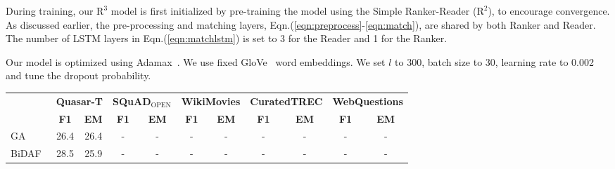 \documentclass[letterpaper]{article} \usepackage{aaai18}  \usepackage{times}  \usepackage{helvet}  \usepackage{courier}  \usepackage{url}  \usepackage{graphicx}  \usepackage{comment}
\begin{document}
During training, our $\text{R}^3$ model is first initialized by pre-training the model using the Simple Ranker-Reader ($\text{R}^2$), to encourage convergence.
As discussed earlier, the pre-processing and matching layers, Eqn.(\ref{eqn:preprocess}-\ref{eqn:match}), are shared by both Ranker and Reader. The number of LSTM layers in Eqn.(\ref{eqn:matchlstm}) is set to 3 for the Reader and 1 for the Ranker.

Our model is optimized using Adamax~\cite{kingma2014adam:iclr2015}. We use fixed GloVe~\cite{glove:emnlp2014} 
word embeddings.
We set $l$ to 300, batch size to 30, learning rate to 0.002 and tune the dropout probability.


\begin{table*}[t]
\centering
\small
\begin{tabular}{lcccccccccc}
\toprule
                  & \multicolumn{2}{c}{\bf Quasar-T} & \multicolumn{2}{c}{\bf SQuAD$_{\textrm{OPEN}}$} & \multicolumn{2}{c}{\bf WikiMovies}  & \multicolumn{2}{c}{\bf CuratedTREC} & \multicolumn{2}{c}{\bf WebQuestions}\\
                  & \bf F1            & \bf EM            & \bf F1            & \bf EM            & \bf F1               & \bf EM               & \bf F1               & \bf EM               & \bf F1               & \bf EM              \\
\midrule
GA~\cite{dhingra2016gated}               & 26.4          & 26.4          & -             & -             & -                & -                & -                & -                & -                & -               \\
BiDAF~\cite{seo2016bidirectional}           & 28.5          & 25.9          & -             & -             & -                & -                & -                & -                & -                & -               \\


\end{tabular}
\end{table*}
\end{document}

